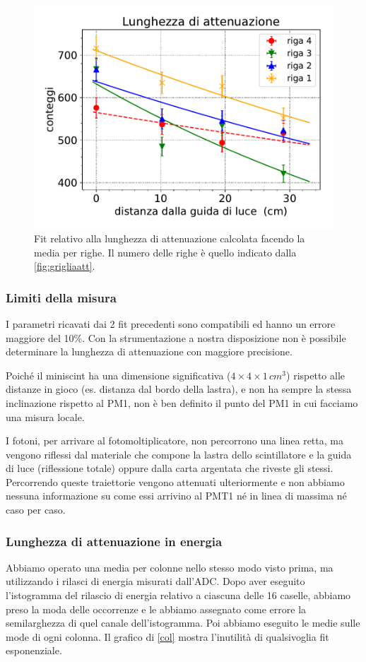\begin{figure}[h]
\centering
\includegraphics[width=8 cm]{4atte}
\caption{Fit relativo alla lunghezza di attenuazione calcolata facendo la media per righe. Il numero delle righe è quello indicato dalla \autoref{fig:grigliaatt}.}
\label{4atte}
\end{figure}


\subsubsection{Limiti della misura}

I parametri ricavati dai 2 fit precedenti sono compatibili ed hanno un errore maggiore del 10\%.
Con la strumentazione a nostra disposizione non è possibile determinare
la lunghezza di attenuazione con maggiore precisione.

Poiché il miniscint ha una dimensione significativa ($4\times4\times1\,\si{cm^3}$)
rispetto alle distanze in gioco (es. distanza dal bordo della lastra),
e non ha sempre la stessa inclinazione rispetto al PM1,
non è ben definito il punto del PM1 in cui facciamo una misura locale.

I fotoni, per arrivare al fotomoltiplicatore, non percorrono una linea retta,
ma vengono riflessi dal materiale che compone la lastra dello scintillatore e la guida di luce (riflessione totale)
oppure dalla carta argentata che riveste gli stessi.
Percorrendo queste traiettorie vengono attenuati ulteriormente e non abbiamo nessuna informazione
su come essi arrivino al PMT1 né in linea di massima né caso per caso.

\subsubsection{Lunghezza di attenuazione in energia}

Abbiamo operato una media per colonne nello stesso modo visto prima, ma utilizzando i rilasci di energia misurati dall'ADC.
Dopo aver eseguito l'istogramma del rilascio di energia relativo a ciascuna delle 16 caselle,
abbiamo preso la moda delle occorrenze
e le abbiamo assegnato come errore la semilarghezza di quel canale dell'istogramma.
Poi abbiamo eseguito le medie sulle mode di ogni colonna.
Il grafico di \autoref{col} mostra l'inutilità di qualsivoglia fit esponenziale.

